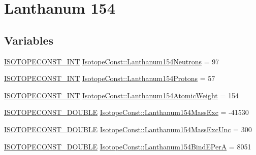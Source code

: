 \hypertarget{group___isotope_const-_lanthanum-_la154}{}\section{Lanthanum 154}
\label{group___isotope_const-_lanthanum-_la154}
\subsection*{Variables}
\begin{DoxyCompactItemize}
\item 
\mbox{\hyperlink{group___isotope_const-_macros_ga5f18360b3e99483a35c32d789e62621c}{I\+S\+O\+T\+O\+P\+E\+C\+O\+N\+S\+T\+\_\+\+I\+NT}} \mbox{\hyperlink{group___isotope_const-_lanthanum-_la154_gae934cd7277df3d00b4731f68c1d491f3}{Isotope\+Const\+::\+Lanthanum154\+Neutrons}} = 97
\item 
\mbox{\hyperlink{group___isotope_const-_macros_ga5f18360b3e99483a35c32d789e62621c}{I\+S\+O\+T\+O\+P\+E\+C\+O\+N\+S\+T\+\_\+\+I\+NT}} \mbox{\hyperlink{group___isotope_const-_lanthanum-_la154_gac614b1a36d462a92b4bffdd9ca9f7b35}{Isotope\+Const\+::\+Lanthanum154\+Protons}} = 57
\item 
\mbox{\hyperlink{group___isotope_const-_macros_ga5f18360b3e99483a35c32d789e62621c}{I\+S\+O\+T\+O\+P\+E\+C\+O\+N\+S\+T\+\_\+\+I\+NT}} \mbox{\hyperlink{group___isotope_const-_lanthanum-_la154_ga49818c5f90129c4610f93432f1d1d2ac}{Isotope\+Const\+::\+Lanthanum154\+Atomic\+Weight}} = 154
\item 
\mbox{\hyperlink{group___isotope_const-_macros_ga8f45a7272ce02c0b4c65c44636ed719a}{I\+S\+O\+T\+O\+P\+E\+C\+O\+N\+S\+T\+\_\+\+D\+O\+U\+B\+LE}} \mbox{\hyperlink{group___isotope_const-_lanthanum-_la154_ga7b0326944bf7e463cd8969642f48c71a}{Isotope\+Const\+::\+Lanthanum154\+Mass\+Exc}} = -\/41530
\item 
\mbox{\hyperlink{group___isotope_const-_macros_ga8f45a7272ce02c0b4c65c44636ed719a}{I\+S\+O\+T\+O\+P\+E\+C\+O\+N\+S\+T\+\_\+\+D\+O\+U\+B\+LE}} \mbox{\hyperlink{group___isotope_const-_lanthanum-_la154_gadfd92172bd337bdc3c5e0642476c42e1}{Isotope\+Const\+::\+Lanthanum154\+Mass\+Exc\+Unc}} = 300
\item 
\mbox{\hyperlink{group___isotope_const-_macros_ga8f45a7272ce02c0b4c65c44636ed719a}{I\+S\+O\+T\+O\+P\+E\+C\+O\+N\+S\+T\+\_\+\+D\+O\+U\+B\+LE}} \mbox{\hyperlink{group___isotope_const-_lanthanum-_la154_gabc956018b4b126906901e1e1d8f00162}{Isotope\+Const\+::\+Lanthanum154\+Bind\+E\+PerA}} = 8051
\item 

\end{DoxyCompactItemize}
